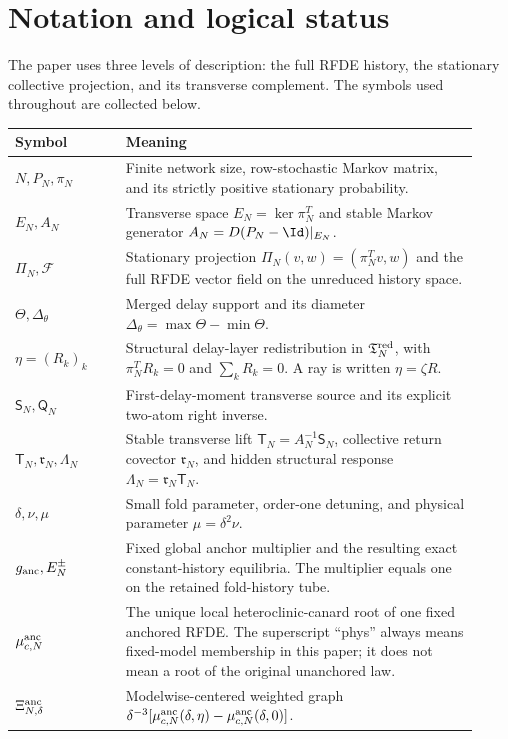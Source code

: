 \section{Notation and logical status}
\label{sec:notation-status}

The paper uses three levels of description: the full RFDE history, the
stationary collective projection, and its transverse complement.  The symbols
used throughout are collected below.

\begin{center}
\small
\begin{tabular}{@{}>{\raggedright\arraybackslash}p{0.22\linewidth}%
>{\raggedright\arraybackslash}p{0.70\linewidth}@{}}
\toprule
Symbol & Meaning\\
\midrule
\(N,P_N,\pi_N\) &
Finite network size, row-stochastic Markov matrix, and its strictly positive
stationary probability.\\
\(E_N,A_N\) &
Transverse space \(E_N=\ker\pi_N^T\) and stable Markov generator
\(A_N=D(P_N-\Id)|_{E_N}\).\\
\(\Pi_N,\mathcal F\) &
Stationary projection \(\Pi_N(v,w)=(\pi_N^Tv,w)\) and the full RFDE vector
field on the unreduced history space.\\
\(\Theta,\Delta_\theta\) &
Merged delay support and its diameter
\(\Delta_\theta=\max\Theta-\min\Theta\).\\
\(\eta=(R_k)_k\) &
Structural delay-layer redistribution in
\(\mathfrak T_N^{\rm red}\), with \(\pi_N^TR_k=0\) and
\(\sum_kR_k=0\).  A ray is written \(\eta=\zeta R\).\\
\(\mathsf S_N,\mathsf Q_N\) &
First-delay-moment transverse source and its explicit two-atom right inverse.\\
\(\mathsf T_N,\mathfrak r_N,\Lambda_N\) &
Stable transverse lift \(\mathsf T_N=A_N^{-1}\mathsf S_N\), collective
return covector \(\mathfrak r_N\), and hidden structural response
\(\Lambda_N=\mathfrak r_N\mathsf T_N\).\\
\(\delta,\nu,\mu\) &
Small fold parameter, order-one detuning, and physical parameter
\(\mu=\delta^2\nu\).\\
\(g_{\rm anc},E_N^\pm\) &
Fixed global anchor multiplier and the resulting exact constant-history
equilibria.  The multiplier equals one on the retained fold-history tube.\\
\(\mu_{c,N}^{\rm anc}\) &
The unique local heteroclinic-canard root of one fixed anchored RFDE.  The
superscript ``phys'' always means fixed-model membership in this paper; it
does not mean a root of the original unanchored law.\\
\(\Xi_{N,\delta}^{\rm anc}\) &
Modelwise-centered weighted graph
\(\delta^{-3}[\mu_{c,N}^{\rm anc}(\delta,\eta)
-\mu_{c,N}^{\rm anc}(\delta,0)]\).\\
\bottomrule
\end{tabular}
\end{center}


